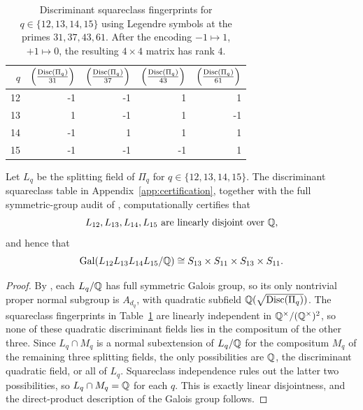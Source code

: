 \begin{table}[b]
\centering
\scriptsize
\setlength{\tabcolsep}{6pt}
\caption{Discriminant squareclass fingerprints for \(q\in\{12,13,14,15\}\)
using Legendre symbols at the primes \(31,37,43,61\).  After the encoding
\(-1\mapsto 1\), \(+1\mapsto 0\), the resulting \(4\times 4\) matrix has rank
\(4\).}
\label{tab:disc-squareclass-q12-15}
\begin{tabular}{r r r r r}
\toprule
\(q\) & \(\left(\frac{\operatorname{Disc}(\Pi_q)}{31}\right)\) &
\(\left(\frac{\operatorname{Disc}(\Pi_q)}{37}\right)\) &
\(\left(\frac{\operatorname{Disc}(\Pi_q)}{43}\right)\) &
\(\left(\frac{\operatorname{Disc}(\Pi_q)}{61}\right)\) \\
\midrule
12 & -1 & -1 & 1 & 1 \\
13 & 1 & -1 & 1 & -1 \\
14 & -1 & 1 & 1 & 1 \\
15 & -1 & -1 & -1 & 1 \\
\bottomrule
\end{tabular}
\end{table}

\begin{observation}[Audited linear disjointness for \(q=12,13,14,15\)]
\label{obs:linear-disjointness-window}
Let \(L_q\) be the splitting field of \(\Pi_q\) for
\(q\in\{12,13,14,15\}\).  The discriminant squareclass table in
Appendix~\ref{app:certification}, together with the full symmetric-group audit
of , computationally certifies that
\[
  L_{12},L_{13},L_{14},L_{15}
  \text{ are linearly disjoint over }\mathbb{Q},
\]
and hence that
\[
  \operatorname{Gal}(L_{12}L_{13}L_{14}L_{15}/\mathbb{Q})
  \cong
  S_{13}\times S_{11}\times S_{13}\times S_{11}.
\]
\end{observation}

\begin{proof}
By , each \(L_q/\mathbb{Q}\) has full symmetric Galois group,
so its only nontrivial proper normal subgroup is \(A_{d_q}\), with quadratic
subfield \(\mathbb{Q}(\sqrt{\operatorname{Disc}(\Pi_q)})\).  The squareclass fingerprints in
Table~\ref{tab:disc-squareclass-q12-15} are linearly independent in
\(\mathbb{Q}^\times/(\mathbb{Q}^\times)^2\), so none of these quadratic discriminant fields
lies in the compositum of the other three.  Since \(L_q\cap M_q\) is a normal
subextension of \(L_q/\mathbb{Q}\) for the compositum \(M_q\) of the remaining three
splitting fields, the only possibilities are \(\mathbb{Q}\), the discriminant
quadratic field, or all of \(L_q\).  Squareclass independence rules out the
latter two possibilities, so \(L_q\cap M_q=\mathbb{Q}\) for each \(q\).  This is
exactly linear disjointness, and the direct-product description of the Galois
group follows.
\end{proof}

